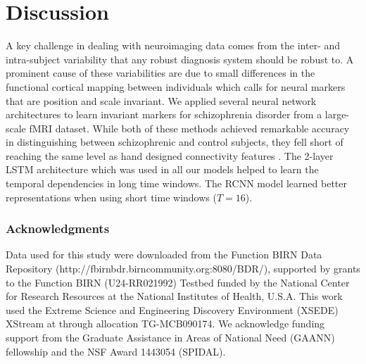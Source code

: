 \documentclass{article}
\begin{document}
\section{Discussion}

A key challenge in dealing with neuroimaging data comes from the inter- and intra-subject variability that any robust diagnosis system should be robust to. A prominent cause of these variabilities are due to small differences in the functional cortical mapping between individuals which calls for neural markers that are position and scale invariant. We applied several neural network architectures to learn invariant markers for schizophrenia disorder from a large-scale fMRI dataset. While both of these methods achieved remarkable accuracy in distinguishing between schizophrenic and control subjects, they fell short of reaching the same level as hand designed connectivity features \citep{Gheiratmand2017}. The 2-layer LSTM architecture which was used in all our models helped to learn the temporal dependencies in long time windows. The RCNN model learned better representations when using short time windows ($T=16$).


\subsubsection*{Acknowledgments}

Data used for this study were downloaded from the Function BIRN Data Repository (http://fbirnbdr.birncommunity.org:8080/BDR/), supported by grants to the Function BIRN (U24-RR021992) Testbed funded by the National Center for Research Resources at the National Institutes of Health, U.S.A. This work used the Extreme Science and Engineering Discovery Environment (XSEDE) XStream at through allocation TG-MCB090174. We acknowledge funding support from the Graduate Assistance in Areas of National Need (GAANN) fellowship and the NSF Award 1443054 (SPIDAL). 



\end{document}
